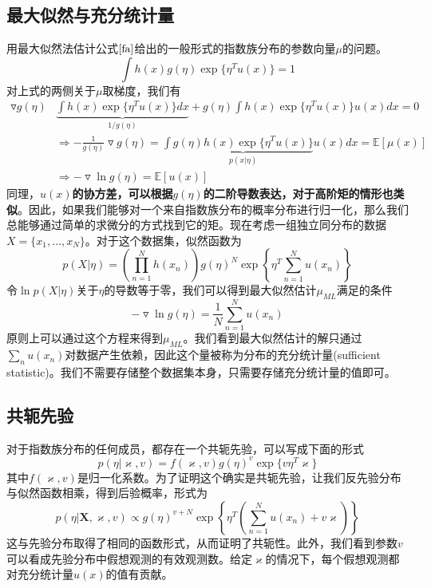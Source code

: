 \subsection*{最大似然与充分统计量}
用最大似然法估计公式$\ref{fa}$给出的一般形式的指数族分布的参数向量$\mu$的问题。
\begin{equation}
	\int h(x)g(\eta)\exp\{\eta^Tu(x)\}=1
\end{equation}
对上式的两侧关于$\mu$取梯度，我们有
\begin{equation}
	\begin{aligned}
	\triangledown g(\eta)&\underbrace{\int h(x)\exp\{\eta^Tu(x) \}dx}_{1/g(\eta)}+g(\eta)\int h(x)\exp\{\eta^Tu(x) \}u(x)dx=0
	\\
	&\Rightarrow -\frac{1}{g(\eta)}\triangledown g(\eta)=\int \underbrace{g(\eta) h(x)\exp\{\eta^Tu(x) \}}_{p(x|\eta)}u(x)dx=\mathbb{E}[\mu(x)]\\
	&\Rightarrow -\triangledown \ln g(\eta)=\mathbb{E}[u(x)]
	\end{aligned}
\end{equation}
同理，\textbf{$u(x)$的协方差，可以根据$g(\eta)$的二阶导数表达，对于高阶矩的情形也类似}。因此，如果我们能够对一个来自指数族分布的概率分布进行归一化，那么我们总能够通过简单的求微分的方式找到它的矩。现在考虑一组独立同分布的数据$X=\{x_1,\dots,x_N \}$。对于这个数据集，似然函数为
\begin{equation}
	p(X|\eta)=\left(\prod_{n=1}^{N}h(x_n) \right)g(\eta )^N\exp\left\{\eta^T\sum_{n=1}^{N}u(x_n) \right\}
\end{equation}
令$\ln p(X|\eta)$关于$\eta$的导数等于零，我们可以得到最大似然估计$\mu_{ML}$满足的条件
\begin{equation}
	-\triangledown \ln g(\eta)=\frac{1}{N}\sum_{n=1}^{N}u(x_n)
\end{equation}
原则上可以通过这个方程来得到$\mu_{ML}$。我们看到最大似然估计的解只通过$\sum_{n}u(x_n)$对数据产生依赖，因此这个量被称为分布的充分统计量(sufficient statistic)。我们不需要存储整个数据集本身，只需要存储充分统计量的值即可。
\subsection*{共轭先验}
对于指数族分布的任何成员，都存在一个共轭先验，可以写成下面的形式
\begin{equation}
	p(\eta|\varkappa ,v)=f(\varkappa,v)g(\eta)^v\exp\{v\eta^T\varkappa \}
\end{equation}
其中$f(\varkappa,v)$是归一化系数。为了证明这个确实是共轭先验，让我们反先验分布与似然函数相乘，得到后验概率，形式为
\begin{equation}
	p(\eta|\boldsymbol{X},\varkappa,v)\propto g(\eta)^{v+N}\exp\left\{\eta^T\left(\sum_{n=1}^{N}u(x_n)+v\varkappa \right) \right\}
\end{equation}
这与先验分布取得了相同的函数形式，从而证明了共轭性。此外，我们看到参数$v$可以看成先验分布中假想观测的有效观测数。给定$\varkappa$的情况下，每个假想观测都对充分统计量$u(x)$的值有贡献。
